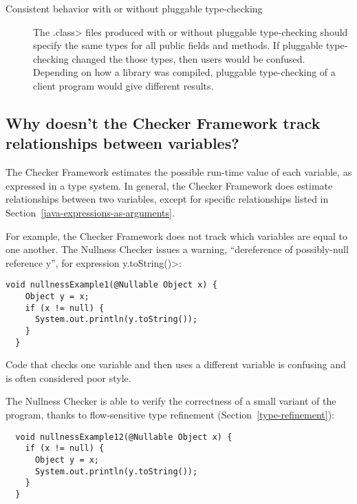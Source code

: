 \begin{description}
\item[Consistent behavior with or without pluggable type-checking]
  The \<.class> files produced with or without pluggable type-checking
  should specify the same types for all public fields and methods.  If
  pluggable type-checking changed the those types, then users would be
  confused.  Depending on how a library was compiled, pluggable
  type-checking of a client program would give different results.

\end{description}



\subsection{Why doesn't the Checker Framework track relationships between variables?\label{faq-relationships-between-variables}}

The Checker Framework estimates the possible run-time value of each
variable, as expressed in a type system.  In general, the Checker Framework
does estimate relationships between two variables, except for specific
relationships listed in Section~\ref{java-expressions-as-arguments}.

For example, the Checker Framework does not track which variables are equal
to one another.  The Nullness Checker issues a warning, ``dereference of
possibly-null reference y'', for expression \<y.toString()>:

\begin{Verbatim}
void nullnessExample1(@Nullable Object x) {
    Object y = x;
    if (x != null) {
      System.out.println(y.toString());
    }
  }
\end{Verbatim}

\noindent
Code that checks one variable and then uses a different variable is
confusing and is often considered poor style.

The Nullness Checker is able to verify the correctness of a small variant
of the program, thanks to flow-sensitive type refinement
(Section~\ref{type-refinement}):

\begin{Verbatim}
  void nullnessExample12(@Nullable Object x) {
    if (x != null) {
      Object y = x;
      System.out.println(y.toString());
    }
  }
\end{Verbatim}

